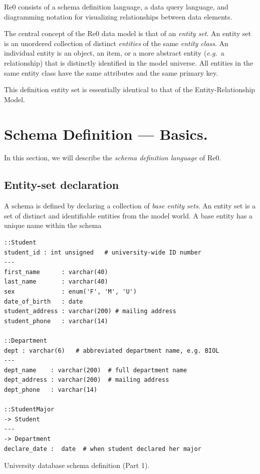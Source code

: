 \documentclass[letter,10pt]{article}
\begin{document}
Re0 consists of a schema definition language, a data query language, and diagramming notation for visualizing relationships between data elements. 

The central concept of the Re0 data model is that of an \emph{entity set}. 
An entity set is an unordered collection of distinct \emph{entities} of the same \emph{entity class}.
An individual entity is an object, an item, or a more abstract entity (\emph{e.g.}\ a relationship) that is distinctly identified in the model universe. 
All entities in the same entity class have the same attributes and the same primary key.

This definition entity set is essentially identical to that of the Entity-Relationship Model.

\section{Schema Definition --- Basics.}\label{sec:basic}
In this section, we will describe the \emph{schema definition language} of Re0.

\subsection{Entity-set declaration}
A schema is defined by declaring a collection of \emph{base entity sets}.
An entity set is a set of distinct and identifiable entities from the model world. 
A base entity has a unique name within the schema 

\begin{lstfloat*}
\begin{lstlisting}[language=dj]
::Student     
student_id : int unsigned   # university-wide ID number 
---
first_name      : varchar(40)
last_name       : varchar(40)
sex             : enum('F', 'M', 'U')
date_of_birth   : date
student_address : varchar(200) # mailing address
student_phone   : varchar(14) 

::Department 
dept : varchar(6)   # abbreviated department name, e.g. BIOL
---
dept_name    : varchar(200)  # full department name
dept_address : varchar(200)  # mailing address
dept_phone   : varchar(14)  

::StudentMajor
-> Student
---
-> Department
declare_date :  date  # when student declared her major  
\end{lstlisting}
\caption{University database schema definition (Part 1).}
\end{lstfloat*}
\end{document}

